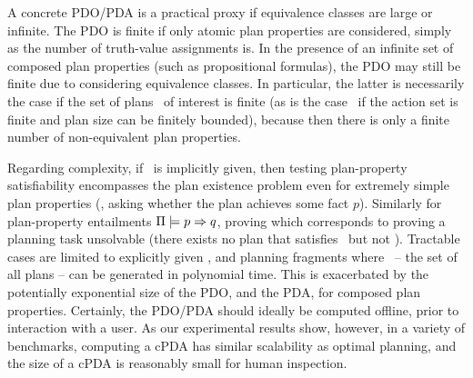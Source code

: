 A concrete PDO/PDA is a practical proxy if equivalence classes are
large or infinite.
%
The PDO is finite if only atomic plan properties are considered,
simply as the number of truth-value assignments is. In the presence of
an infinite set of composed plan properties (such as propositional
formulas), the PDO may still be finite due to considering equivalence
classes. In particular, the latter is necessarily the case if the set
of plans \plans\ of interest is finite (as is the case \eg\ if the
action set is finite and plan size can be finitely bounded), because
then there is only a finite number of non-equivalent plan properties.

Regarding complexity, if \plans\ is implicitly given, then testing
plan-property satisfiability encompasses the plan existence problem
even for extremely simple plan properties (\eg, asking whether the
plan achieves some fact $p$). Similarly for plan-property entailments
$\Pi \models p \Rightarrow q$, proving which corresponds to
proving a planning task unsolvable (there exists no plan that
satisfies \prop\ but not \propq). Tractable cases are limited to
explicitly given \plans, and planning fragments where \plans\ -- the
set of all plans -- can be generated in polynomial time. This is
exacerbated by the potentially exponential size of the PDO, and the
PDA, for composed plan properties. Certainly, the PDO/PDA should
ideally be computed offline, prior to interaction with a user. As our
experimental results show, however, in a variety of benchmarks,
computing a cPDA has similar scalability as optimal planning, and the
size of a cPDA is reasonably small for human inspection.


%
%



